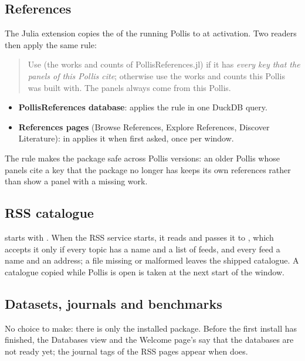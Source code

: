 \subsection{References}
The Julia extension copies the  of the running Pollis to 
at activation. Two readers then apply the same rule:
\begin{quote}\small
Use  (the works and counts of PollisReferences.jl) if it has \emph{every key that the panels of this
Pollis cite}; otherwise use the works and counts this Pollis was built with. The panels always come from this Pollis.
\end{quote}
\begin{itemize}
  \item \textbf{PollisReferences database}:  applies the rule in one DuckDB query.
  \item \textbf{References pages} (Browse References, Explore References, Discover Literature):
     in  applies it when first asked, once per window.
\end{itemize}
The rule makes the package safe across Pollis versions: an older Pollis whose panels cite a key that the package no
longer has keeps its own references rather than show a panel with a missing work.

\subsection{RSS catalogue}
 starts with . When the RSS service starts, it reads
 and passes it to , which accepts it only if every topic
has a name and a list of feeds, and every feed a name and an address; a file missing or malformed leaves the shipped
catalogue. A catalogue copied while Pollis is open is taken at the next start of the window.

\subsection{Datasets, journals and benchmarks}
No choice to make: there is only the installed package. Before the first install has finished, the Databases view
and the Welcome page's  say that the databases are not ready yet; the journal tags of the RSS pages
appear when  does.

